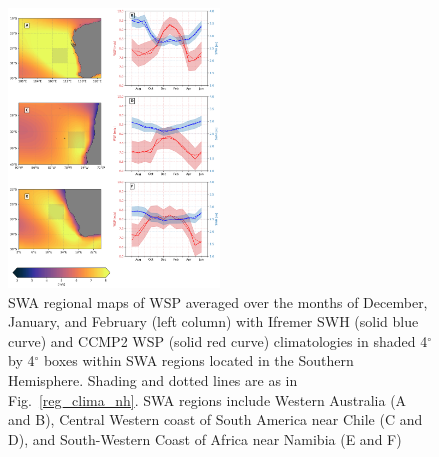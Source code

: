 \documentclass[draft,linenumbers]{agujournal2018}
\begin{document}
\begin{figure}[tbh]
\centering
\includegraphics[width=0.5\textwidth]{figs/regional_climatologies/paper_regional_clima_sh.png}
\caption{SWA  regional maps of WSP averaged over the months of December, January, and February (left column) with Ifremer SWH (solid blue curve) and CCMP2 WSP (solid red curve) climatologies in shaded 4$^{\circ}$ by 4$^{\circ}$ boxes within SWA regions located in the Southern Hemisphere. Shading and dotted lines are as in Fig.~\ref{reg_clima_nh}. SWA regions include Western Australia (A and B), Central Western coast of South America near Chile (C and D), and South-Western Coast of Africa near Namibia (E and F)}
\label{reg_clima_sh}
\end{figure}


\end{document}

